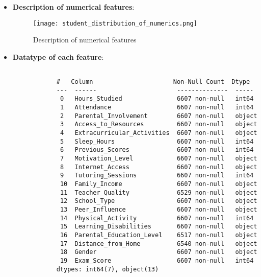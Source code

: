 \documentclass{article}
\begin{document}
\begin{enumerate}
\begin{itemize}
\begin{itemize}
\begin{verbatim}
                ['Near' 'Moderate' 'Far' nan]

            \end{verbatim}

        \end{itemize}

        \newpage
        \item \textbf{Description of numerical features}:
        \begin{figure}[H]  %

            \centering
            \texttt{[image: student\_distribution\_of\_numerics.png]}  %
            \caption{Description of numerical features}
            \label{fig:Figure_8}  %
        \end{figure}

        \item \textbf{Datatype of each feature}:
        \begin{verbatim}

            #   Column                      Non-Null Count  Dtype 
            ---  ------                      --------------  ----- 
             0   Hours_Studied               6607 non-null   int64 
             1   Attendance                  6607 non-null   int64 
             2   Parental_Involvement        6607 non-null   object
             3   Access_to_Resources         6607 non-null   object
             4   Extracurricular_Activities  6607 non-null   object
             5   Sleep_Hours                 6607 non-null   int64 
             6   Previous_Scores             6607 non-null   int64 
             7   Motivation_Level            6607 non-null   object
             8   Internet_Access             6607 non-null   object
             9   Tutoring_Sessions           6607 non-null   int64 
             10  Family_Income               6607 non-null   object
             11  Teacher_Quality             6529 non-null   object
             12  School_Type                 6607 non-null   object
             13  Peer_Influence              6607 non-null   object
             14  Physical_Activity           6607 non-null   int64 
             15  Learning_Disabilities       6607 non-null   object
             16  Parental_Education_Level    6517 non-null   object
             17  Distance_from_Home          6540 non-null   object
             18  Gender                      6607 non-null   object
             19  Exam_Score                  6607 non-null   int64 
            dtypes: int64(7), object(13)


\end{verbatim}
\end{itemize}
\end{enumerate}
\end{document}
